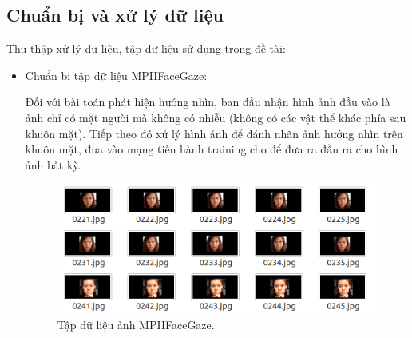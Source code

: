 \subsection{Chuẩn bị và xử lý dữ liệu}
Thu thập xử lý dữ liệu, tập dữ liệu sử dụng trong đề tài:
\begin{itemize}
\item Chuẩn bị tập dữ liệu  MPIIFaceGaze:\cite{dataset}

 Đối với bài toán phát hiện hướng nhìn, ban đầu nhận hình ảnh đầu vào là ảnh chỉ có mặt người mà không có nhiễu (không có các vật thể khác phía sau khuôn mặt). Tiếp theo đó xử lý hình ảnh để đánh nhãn ảnh hướng nhìn trên khuôn mặt, đưa vào mạng tiến hành training cho để đưa ra đầu ra cho hình ảnh bất kỳ.
 \begin{center}
    \begin{figure}[h!]
    \begin{center}
     \includegraphics[scale=0.75]{img/MPIIFaceGaze-anh.png}
    \end{center}
    \caption{Tập dữ liệu ảnh MPIIFaceGaze.}
    \label{refhinh20}
    \end{figure}
\end{center}
 
\end{itemize}
